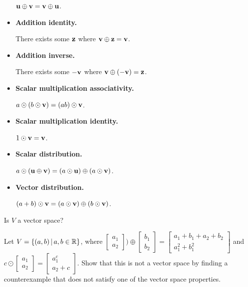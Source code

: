 \begin{applicationActivities}
\begin{activity}{25}
\begin{subactivity}
\begin{multicols}{2}
\begin{itemize}
            \(\mathbf u\oplus\mathbf v=
            \mathbf v\oplus\mathbf u\).
      \item \textbf{Addition identity.}

            There exists some \(\mathbf z\)
            where \(\mathbf v\oplus\mathbf z=\mathbf v\).
      \item \textbf{Addition inverse.}

            There exists some \(-\mathbf v\)
            where \(\mathbf v\oplus(-\mathbf v)=\mathbf z\).
      \item \textbf{Scalar multiplication associativity.}

            \(a\odot(b\odot\mathbf v)=(ab)\odot\mathbf v\).
      \item \textbf{Scalar multiplication identity.}

            \(1\odot\mathbf v=\mathbf v\).
      \item \textbf{Scalar distribution.}

            \(a\odot(\mathbf u\oplus\mathbf v)=
            (a\odot\mathbf u)\oplus (a\odot\mathbf v)\).
      \item \textbf{Vector distribution.}

            \((a+b)\odot\mathbf v=(a\odot\mathbf v)\oplus (b\odot\mathbf v)\).
    \end{itemize}
    \end{multicols}
  \end{subactivity}

  \begin{subactivity}
    Is \(V\) a vector space?
  \end{subactivity}
\end{activity}


\begin{activity}{10}
  Let \(V=\left\{(a,b)\,\middle|\,a,b\in\mathbb{R}\right\}\), where
  \(\begin{bmatrix} a_1 \\ a_2 \end{bmatrix})\oplus \begin{bmatrix}b_1 \\ b_2\end{bmatrix}=
  \begin{bmatrix}a_1+b_1+a_2+b_2 \\ a_1^2+b_1^2\end{bmatrix}\) and \(c\odot \begin{bmatrix} a_1 \\ a_2\end{bmatrix}=\begin{bmatrix} a_1^c \\ a_2+c\end{bmatrix}\). Show that
  this is not a vector space by finding a counterexample
  that does not satisfy one of the vector space properties.


\end{activity}
\end{applicationActivities}

